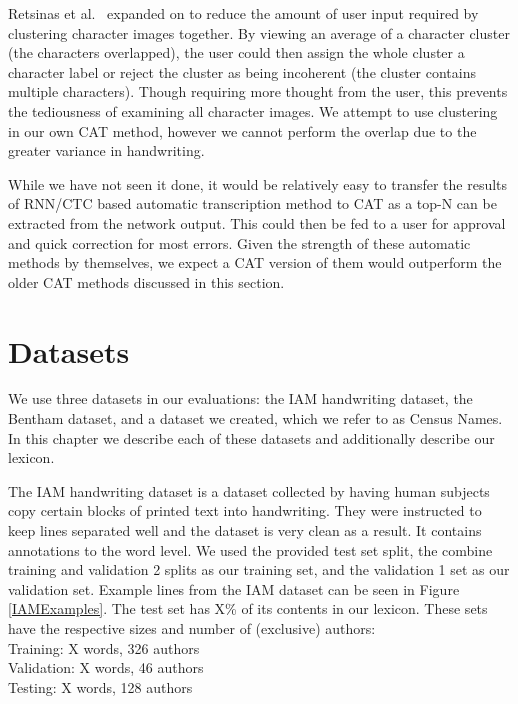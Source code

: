 \documentclass[ms,electronic,twosidetoc,letterpaper,chaptercenter,parttop,lol,lof,lot]{byumsphd}
\begin{document}
Retsinas et al.~\cite{Retsinas2015} expanded on \cite{Neudecker2010} to reduce the amount of user input required by clustering character images together. By viewing an average of a character cluster (the characters overlapped), the user could then assign the whole cluster a character label or reject the cluster as being incoherent (the cluster contains multiple characters). Though requiring more thought from the user, this prevents the tediousness of examining all character images. %
We attempt to use clustering in our own CAT method, however we cannot perform the overlap due to the greater variance in handwriting.

While we have not seen it done, it would be relatively easy to transfer the results of RNN/CTC based automatic transcription method to CAT as a top-N can be extracted from the network output. This could then be fed to a user for approval and quick correction for most errors. Given the strength of these automatic methods by themselves, we expect a CAT version of them would outperform the older CAT methods discussed in this section. 




\chapter{Datasets}\label{datasets}

We use three datasets in our evaluations: the IAM handwriting dataset, the Bentham dataset, and a dataset we created, which we refer to as Census Names. In this chapter we describe each of these datasets and additionally describe our lexicon.

The IAM handwriting dataset \cite{IAM} is a dataset collected by having human subjects copy certain blocks of printed text into handwriting. They were instructed to keep lines separated well and the dataset is very clean as a result. It contains annotations to the word level. We used the provided test set split, the combine training and validation 2 splits as our training set, and the validation 1 set as our validation set.
Example lines from the IAM dataset can be seen in Figure \ref{IAMExamples}.
The test set has X\% of its contents in our lexicon.
These sets have the respective sizes and number of (exclusive) authors:\\
\indent \indent Training: X words, 326 authors\\
\indent \indent Validation: X words, 46 authors\\
\indent \indent Testing: X words, 128 authors
\end{document}
